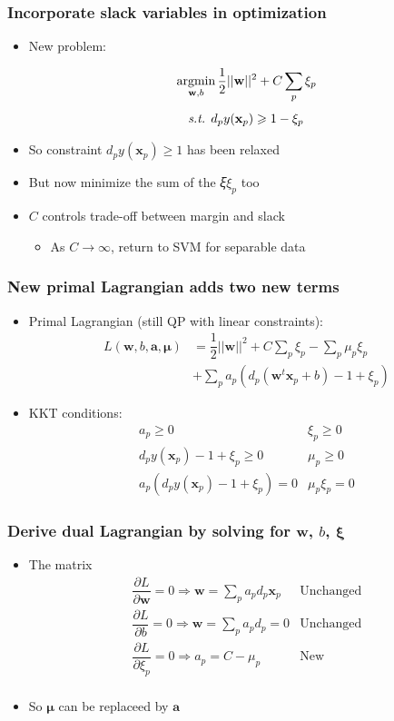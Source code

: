 \documentclass[12pt,notes,mathserif]{beamer}
\begin{document}
\begin{frame}[c]
\frametitle{Incorporate slack variables in optimization}
\begin{itemize}
\item New problem:


$$\mathop{\mathrm{argmin}}_{\mathbf{w},b}  \frac{1}{2} ||\mathbf{w}||^2+C\sum_p\xi_p$$
$$\text{\textit{s.t.} }  d_py(\mathbf{x}_p)\geqslant{}1-\xi_p$$

\item So constraint $d_py(\mathbf{x}_p)\geqslant{}1$ has been relaxed
\item But now minimize the sum of the 𝜉$\xi_p$ too
\item $C$ controls trade-off between margin and slack
\begin{itemize}
\item As $C\to \infty$, return to SVM for separable data
\end{itemize}
\end{itemize}
\end{frame}

\begin{frame}[c]
\frametitle{New primal Lagrangian adds two new terms}
\begin{itemize}
\item Primal Lagrangian (still QP with linear constraints):
\begin{eqnarray*}
L(\mathbf{w},b,\mathbf{a},\mathbf{\mu}) &=\dfrac{1}{2}||\mathbf{w}||^2+C\sum_p\xi_p-\sum_p\mu_p\xi_p\\
\quad & +\sum_pa_p(d_p(\mathbf{w}^t\mathbf{x}_p+b)-1+\xi_p)
\end{eqnarray*}
\item KKT conditions:
\[\begin{matrix}
a_p\geqslant{}0 &\xi_p\geqslant{}0\\
d_py(\mathbf{x}_p)-1+\xi_p\geqslant{}0&\mu_p\geqslant{}0\\
a_p(d_py(\mathbf{x}_p)-1+\xi_p)=0&\mu_p\xi_p=0
\end{matrix}\]
\end{itemize}
\end{frame}

\begin{frame}[c]
\frametitle{Derive dual Lagrangian by solving for $\mathbf{w}$, $b$, $\mathbf{\xi}$}
\begin{itemize}
\item The matrix
\[
\begin{matrix}
\dfrac{\partial L}{\partial \mathbf{w}}=0 \Rightarrow \mathbf{w}=\sum\limits_pa_pd_p\mathbf{x}_p&\text{Unchanged}\\
\dfrac{\partial L}{\partial b}=0 \Rightarrow \mathbf{w}=\sum\limits_pa_pd_p=0&\text{Unchanged}\\
\dfrac{\partial L}{\partial \xi_p}=0 \Rightarrow a_p=C-\mu_p&\text{New}\\
\end{matrix}
\]
\item So $\mathbf{\mu}$ can be replaceed by $\mathbf{a}$
\end{itemize}
\end{frame}
\end{document}
